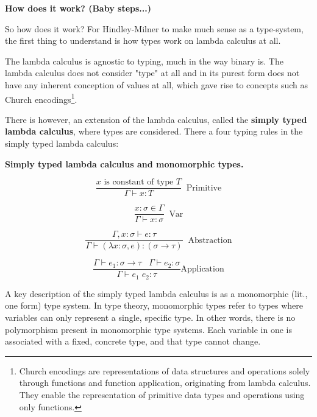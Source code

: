 \documentclass{l4proj}
\begin{document}
\textbf{How does it work? (Baby steps...)}

So how does it work?
For Hindley-Milner to make much sense as a type-system, the first thing to understand is how types work on lambda calculus at all.

The lambda calculus is agnostic to typing, much in the way binary is.
The lambda calculus does not consider "type" at all and in its purest form does not have any inherent conception of values at all, which gave rise to concepts such as Church encodings\footnote{Church encodings are representations of data structures and operations solely through functions and function application, originating from lambda calculus. They enable the representation of primitive data types and operations using only functions.}. 

There is however, an extension of the lambda calculus, called the \textbf{simply typed lambda calculus}, where types are considered.
There a four typing rules in the simply typed lambda calculus:

\textbf{Simply typed lambda calculus and monomorphic types.}

\begin{equation} \label{eq:stlc-primitives-rule}
    \frac{x\text{ is constant of type }T}{\Gamma \vdash x:T} \;\;\text{Primitive}
\end{equation}

\begin{equation} \label{eq:stlc-var-rule}
    \frac{x:\sigma \in \Gamma}{\Gamma \vdash x:\sigma} \;\;\text{Var}
\end{equation}

\begin{equation} \label{eq:stlc-abstraction}
    \frac{\Gamma, x:\sigma \vdash e:\tau}{\Gamma \vdash (\lambda x:\sigma, e): (\sigma \rightarrow \tau)} \;\;\text{Abstraction}
\end{equation}

\begin{equation} \label{eq:stlc-application}
    \frac{\Gamma \vdash e_1:\sigma\rightarrow\tau \;\;\; \Gamma \vdash e_2:\sigma}{\Gamma \vdash e_1 \; e_2:\tau} \text{Application}
\end{equation}

A key description of the simply typed lambda calculus is as a monomorphic (lit., one form) type system.
In type theory, monomorphic types refer to types where variables can only represent a single, specific type.
In other words, there is no polymorphism present in monomorphic type systems. Each variable in one is associated with a fixed, concrete type, and that type cannot change.
\end{document}
